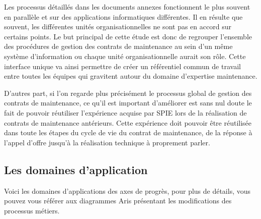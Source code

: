 Les processus détaillés dans les documents annexes fonctionnent le plus souvent en parallèle et sur des applications informatiques différentes. Il en résulte que souvent, les différentes unités organisationnelles ne sont pas en accord sur certains points. Le but principal de cette étude est donc de regrouper l'ensemble des procédures de gestion des contrats de maintenance au sein d'un même système d'information ou chaque unité organisationnelle aurait son rôle. Cette interface unique va ainsi permettre de créer un référentiel commun de travail entre toutes les équipes qui gravitent autour du domaine d'expertise maintenance. 

D'autres part, si l'on regarde plus précisément le processus global de gestion des contrats de maintenance, ce qu'il est important d'améliorer est sans nul doute le fait de pouvoir réutiliser l'expérience acquise par SPIE lors de la réalisation de contrats de maintenance antérieurs. Cette expérience doit pouvoir être réutilisée dans toute les étapes du cycle de vie du contrat de maintenance, de la réponse à l'appel d'offre jusqu'à la réalisation technique à proprement parler.

\subsection {Les domaines d'application}

Voici les domaines d'applications des axes de progrès, pour plus de détails, vous pouvez vous référer aux diagrammes Aris présentant les modifications des processus métiers.

